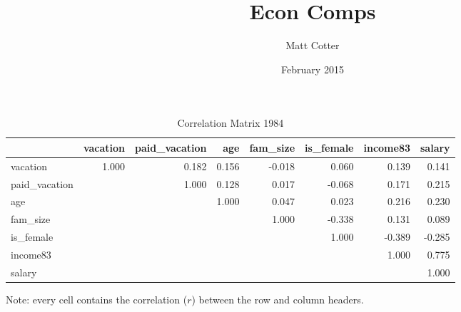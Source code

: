 \documentclass{article}
\title{Econ Comps}
\author{Matt Cotter}
\date{February 2015}
\begin{document}


    \setlength{\extrarowheight}{3pt}
    \begin{table}[h]
    \centering
    \hspace*{-1.5cm}
    \begin{tabular}{l|r|r|r|r|r|r|r}
                     & vacation & paid\_vacation &   age & fam\_size & is\_female & income83 & salary \\ \hline
      vacation       &    1.000 &          0.182 & 0.156 &    -0.018 &      0.060 &    0.139 &  0.141 \\ \hline
      paid\_vacation &          &          1.000 & 0.128 &     0.017 &     -0.068 &    0.171 &  0.215 \\ \hline
      age            &          &                & 1.000 &     0.047 &      0.023 &    0.216 &  0.230 \\ \hline
      fam\_size      &          &                &       &     1.000 &     -0.338 &    0.131 &  0.089 \\ \hline
      is\_female     &          &                &       &           &      1.000 &   -0.389 & -0.285 \\ \hline
      income83       &          &                &       &           &            &    1.000 &  0.775 \\ \hline
      salary         &          &                &       &           &            &          &  1.000
    \end{tabular}
    \hspace*{-1.5cm}
    \caption{Correlation Matrix 1984}
    \label{1984-correlation}
      Note: every cell contains the correlation ($r$) between the row and column headers.
    \end{table}
    \setlength{\extrarowheight}{3pt}
\end{document}
